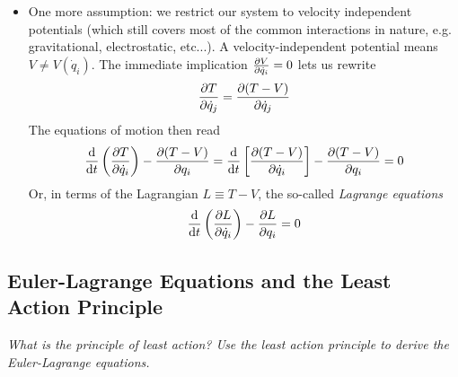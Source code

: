 \documentclass[11pt, a4paper]{article}
\begin{document}
\begin{itemize}
	\item One more assumption: we restrict our system to velocity independent potentials (which still covers most of the common interactions in nature, e.g. gravitational, electrostatic, etc...). A velocity-independent potential means $ V \neq V(\dot{q}_{i})$. The immediate implication $ \pdv{V}{\dot{q}_{i}} = 0 $ lets us rewrite
	\begin{equation*}
		\pdv{T}{\dot{q}_{j}} = \pdv{(T - V)}{\dot{q}_{j}}
	\end{equation*}
	The equations of motion then read
	\begin{equation*}
		\dv{}{t} \left(\pdv{T}{\dot{q}_{i}}\right) - \pdv{(T - V)}{q_{i}} = \dv{}{t} \left[\pdv{(T - V)}{\dot{q}_{i}}\right] - \pdv{(T - V)}{q_{i}} = 0
	\end{equation*}
	Or, in terms of the Lagrangian $ L \equiv T - V $, the so-called \textit{Lagrange equations}
	\begin{equation*}
		\dv{}{t} \left(\pdv{L}{\dot{q}_{i}}\right) - \pdv{L}{q_{i}} = 0
	\end{equation*}
	
\end{itemize}

\subsection{Euler-Lagrange Equations and the Least Action Principle}
\textit{What is the principle of least action? Use the least action principle to derive the Euler-Lagrange equations.}
\end{document}
